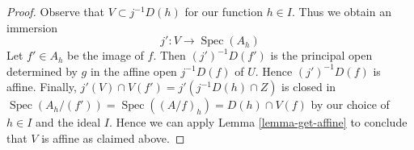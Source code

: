 \documentclass[10pt,a4paper]{amsart}
\theoremstyle{plain}
\theoremstyle{definition}
\theoremstyle{remark}
\numberwithin{equation}{subsection}
\def\Spec{\mathop{\mathrm{Spec}}}
\begin{document}
\begin{proof}
\medskip\noindent
Observe that $V \subset j^{-1}D(h)$ for our function $h \in I$.
Thus we obtain an immersion
$$
j' : V \longrightarrow \Spec(A_h)
$$
Let $f' \in A_h$ be the image of $f$. Then $(j')^{-1}D(f')$
is the principal open determined by $g$ in the affine
open $j^{-1}D(f)$ of $U$.
Hence $(j')^{-1}D(f)$ is affine. Finally,
$j'(V) \cap V(f') = j'(j^{-1}D(h) \cap Z)$
is closed in $\Spec(A_h/(f')) = \Spec((A/f)_h) = D(h) \cap V(f)$
by our choice of $h \in I$ and the ideal $I$. Hence we can apply
Lemma \ref{lemma-get-affine}
to conclude that $V$ is affine as claimed above.
\end{proof}



\end{document}
